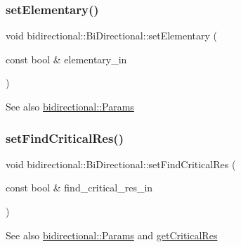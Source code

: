 \subsubsection{\texorpdfstring{set\+Elementary()}{setElementary()}}
{\footnotesize\ttfamily void bidirectional\+::\+Bi\+Directional\+::set\+Elementary (\begin{DoxyParamCaption}\item[{const bool \&}]{elementary\+\_\+in }\end{DoxyParamCaption})\hspace{0.3cm}{\ttfamily [inline]}}

\begin{DoxySeeAlso}{See also}
\hyperlink{classbidirectional_1_1Params}{bidirectional\+::\+Params} 
\end{DoxySeeAlso}
\mbox{\label{classbidirectional_1_1BiDirectional_ad309aa627316fbccdf1d6e747d064c05}} 
\subsubsection{\texorpdfstring{set\+Find\+Critical\+Res()}{setFindCriticalRes()}}
{\footnotesize\ttfamily void bidirectional\+::\+Bi\+Directional\+::set\+Find\+Critical\+Res (\begin{DoxyParamCaption}\item[{const bool \&}]{find\+\_\+critical\+\_\+res\+\_\+in }\end{DoxyParamCaption})\hspace{0.3cm}{\ttfamily [inline]}}

\begin{DoxySeeAlso}{See also}
\hyperlink{classbidirectional_1_1Params}{bidirectional\+::\+Params} and \hyperlink{namespacebidirectional_a7b92b2282139801a9e2668a743ad07a1}{get\+Critical\+Res} 
\end{DoxySeeAlso}
\mbox{\label{classbidirectional_1_1BiDirectional_a11320df93ad8e5747aa1f3e14cbe44bd}} 
